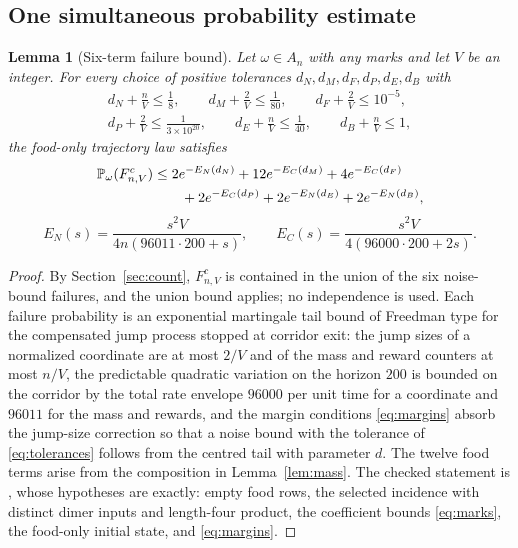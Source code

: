 \documentclass[11pt,letterpaper]{article}
\theoremstyle{plain}
\newtheorem{lemma}[theorem]{Lemma}
\theoremstyle{definition}
\theoremstyle{remark}
\numberwithin{equation}{section}
\newcommand{\PP}{\mathbb P}
\begin{document}
\subsection{One simultaneous probability estimate}\label{sec:noise}
\begin{lemma}[Six-term failure bound]\label{lem:six}
Let $\omega\in A_n$ with any marks and let $V$ be an integer. For every choice of positive tolerances $d_N,d_M,d_F,d_P,d_E,d_B$ with
\begin{equation}\label{eq:margins}
\begin{gathered}
 d_N+\frac nV\le\frac18,\qquad d_M+\frac2V\le\frac1{80},\qquad d_F+\frac2V\le10^{-5},\\
 d_P+\frac2V\le\frac1{3\times10^{20}},\qquad d_E+\frac nV\le\frac1{40},\qquad d_B+\frac nV\le1,
\end{gathered}
\end{equation}
the food-only trajectory law satisfies
\begin{align}
 \PP_\omega(F_{n,V}^c)&\le2e^{-E_N(d_N)}+12e^{-E_C(d_M)}+4e^{-E_C(d_F)}\notag\\
 &\qquad+2e^{-E_C(d_P)}+2e^{-E_N(d_E)}+2e^{-E_N(d_B)},\label{eq:six}
\end{align}
\begin{equation}\label{eq:exponents}
 E_N(s)=\frac{s^2V}{4n(96011\cdot200+s)},\qquad E_C(s)=\frac{s^2V}{4(96000\cdot200+2s)} .
\end{equation}
\end{lemma}
\begin{proof}
By Section~\ref{sec:count}, $F_{n,V}^c$ is contained in the union of the six noise-bound failures, and the union bound applies; no independence is used. Each failure probability is an exponential martingale tail bound of Freedman type \cite{freedman1975tail} for the compensated jump process stopped at corridor exit: the jump sizes of a normalized coordinate are at most $2/V$ and of the mass and reward counters at most $n/V$, the predictable quadratic variation on the horizon $200$ is bounded on the corridor by the total rate envelope $96000$ per unit time for a coordinate and $96011$ for the mass and rewards, and the margin conditions \eqref{eq:margins} absorb the jump-size correction so that a noise bound with the tolerance of \eqref{eq:tolerances} follows from the centred tail with parameter $d$. The twelve food terms arise from the composition in Lemma~\ref{lem:mass}. The checked statement is , whose hypotheses are exactly: empty food rows, the selected incidence with distinct dimer inputs and length-four product, the coefficient bounds \eqref{eq:marks}, the food-only initial state, and \eqref{eq:margins}.
\end{proof}
\end{document}
